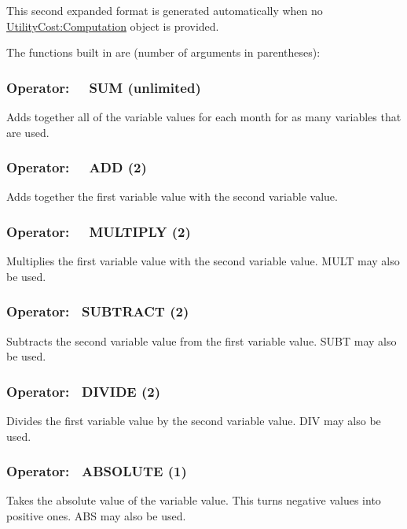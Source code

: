 This second expanded format is generated automatically when no \hyperref[utilitycostcomputation]{UtilityCost:Computation} object is provided.

The functions built in are (number of arguments in parentheses):

\subsubsection{Operator:~~ SUM (unlimited)}\label{operator-sum-unlimited}

Adds together all of the variable values for each month for as many variables that are used.

\subsubsection{Operator:~~ ADD (2)}\label{operator-add-2}

Adds together the first variable value with the second variable value.

\subsubsection{Operator:~~ MULTIPLY (2)}\label{operator-multiply-2}

Multiplies the first variable value with the second variable value. MULT may also be used.

\subsubsection{Operator:~ SUBTRACT (2)}\label{operator-subtract-2}

Subtracts the second variable value from the first variable value. SUBT may also be used.

\subsubsection{Operator:~ DIVIDE (2)}\label{operator-divide-2}

Divides the first variable value by the second variable value. DIV may also be used.

\subsubsection{Operator:~ ABSOLUTE (1)}\label{operator-absolute-1}

Takes the absolute value of the variable value. This turns negative values into positive ones. ABS may also be used.

